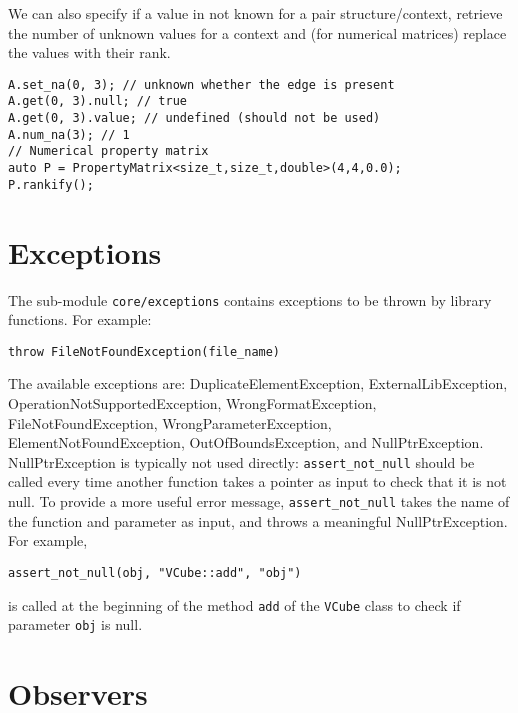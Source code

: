 We can also specify if a value in not known for a pair structure/context, retrieve the number of unknown values for a context and (for numerical matrices) replace the values with their rank.
\begin{lstlisting}[style=c++]
A.set_na(0, 3); // unknown whether the edge is present
A.get(0, 3).null; // true
A.get(0, 3).value; // undefined (should not be used)
A.num_na(3); // 1
// Numerical property matrix
auto P = PropertyMatrix<size_t,size_t,double>(4,4,0.0);
P.rankify();
\end{lstlisting}

\section{Exceptions}

The sub-module \texttt{core/exceptions} contains exceptions to be thrown by library functions. For example:
\begin{lstlisting}[style=c++]
throw FileNotFoundException(file_name)
\end{lstlisting}
The available exceptions are: DuplicateElementException, ExternalLibException, OperationNotSupportedException, WrongFormatException, FileNotFoundException, WrongParameterException, ElementNotFoundException, OutOfBoundsException, and NullPtrException. NullPtrException is typically not used directly: \texttt{assert\_not\_null} should be called every time another function takes a pointer as input to check that it is not null. To provide a more useful
error message, \texttt{assert\_not\_null} takes the name of the function and parameter as input, and throws a meaningful NullPtrException. For example,
\begin{lstlisting}[style=c++]
assert_not_null(obj, "VCube::add", "obj")
\end{lstlisting}
is called at the beginning of the method \texttt{add} of the \texttt{VCube} class to check if parameter \texttt{obj} is null.

\section{Observers}

